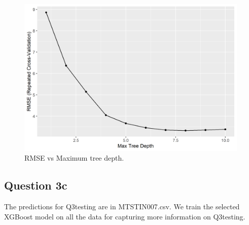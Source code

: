 \documentclass[
]{article}
\begin{document}
\begin{figure}
\centering
\includegraphics[width=4.36458in,height=\textheight]{rmse_xgboost.png}
\caption{RMSE vs Maximum tree depth.}
\end{figure}

\hypertarget{question-3c}{%
\subsection{Question 3c}\label{question-3c}}

The predictions for Q3testing are in MTSTIN007.csv. We train the
selected XGBoost model on all the data for capturing more information on
Q3testing.
\end{document}
